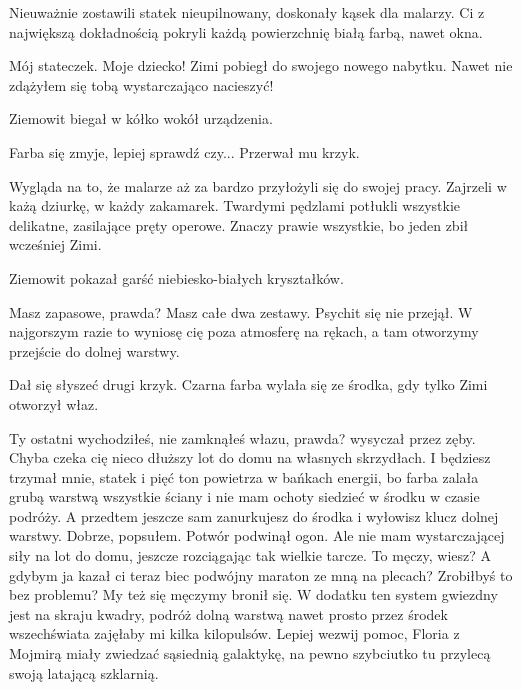 Nieuważnie zostawili statek nieupilnowany, doskonały kąsek dla malarzy.
Ci z największą dokładnością pokryli każdą powierzchnię białą farbą, nawet okna.

\begin{dialogue}
\ds{} Mój stateczek. Moje dziecko! \dm{} Zimi pobiegł do swojego nowego nabytku. \dm{} Nawet nie zdążyłem się tobą wystarczająco nacieszyć!
\end{dialogue}

Ziemowit biegał w kółko wokół urządzenia.

\begin{dialogue}
\ds{} Farba się zmyje, lepiej sprawdź czy... \dm{} Przerwał mu krzyk.
\end{dialogue}

Wygląda na to, że malarze aż za bardzo przyłożyli się do swojej pracy. 
Zajrzeli w każą dziurkę, w każdy zakamarek.
Twardymi pędzlami potłukli wszystkie delikatne, zasilające pręty operowe.
Znaczy prawie wszystkie, bo jeden zbił wcześniej Zimi.

Ziemowit pokazał garść niebiesko-białych kryształków.

\begin{dialogue}
\ds{} Masz zapasowe, prawda? Masz całe dwa zestawy. \dm{} Psychit się nie przejął. \dm{}
W najgorszym razie to wyniosę cię poza atmosferę na rękach, a tam otworzymy przejście do dolnej warstwy.
\end{dialogue}

Dał się słyszeć drugi krzyk. Czarna farba wylała się ze środka, gdy tylko Zimi otworzył właz.

\begin{dialogue}
\ds{} Ty ostatni wychodziłeś, nie zamknąłeś włazu, prawda? \dm{} wysyczał przez zęby. \dm{} Chyba czeka cię nieco dłuższy lot do domu na własnych skrzydłach. 
I będziesz trzymał mnie, statek i pięć ton powietrza w bańkach energii, bo farba zalała grubą warstwą wszystkie ściany i nie mam ochoty siedzieć w środku w czasie podróży.
A przedtem jeszcze sam zanurkujesz do środka i wyłowisz klucz dolnej warstwy.
\ds{} Dobrze, popsułem. \dm{} Potwór podwinął ogon. \dm{} Ale nie mam wystarczającej siły na lot do domu, jeszcze rozciągając tak wielkie tarcze. To męczy, wiesz? 
A gdybym ja kazał ci teraz biec podwójny maraton ze mną na plecach? Zrobiłbyś to bez problemu? My też się męczymy \dm{} bronił się. \dm{} 
W dodatku ten system gwiezdny jest na skraju kwadry, podróż dolną warstwą nawet prosto przez środek wszechświata zajęłaby mi kilka kilopulsów. 
Lepiej wezwij pomoc, Floria z Mojmirą miały zwiedzać sąsiednią galaktykę, na pewno szybciutko tu przylecą swoją latającą szklarnią.
\end{dialogue}

